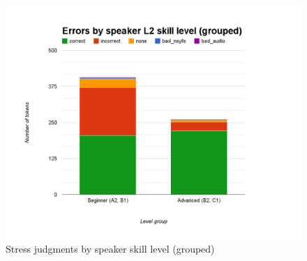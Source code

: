 			
			
			
%				
			
			\begin{figure}[htb]
				\centering
				\includegraphics[width=\textwidth]{img/annotation/skillLevelGroupsBars}
				\caption{Stress judgments by speaker skill level (grouped)}
				\label{fig:levelgroupsbars}
			\end{figure}
			
